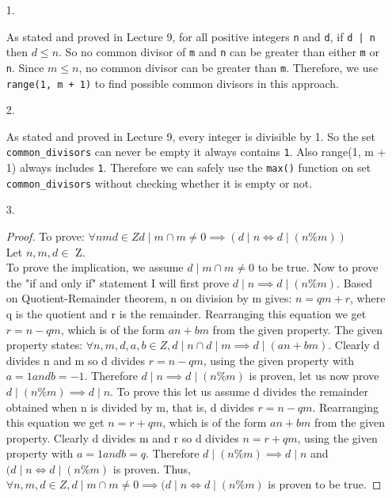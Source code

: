 \documentclass[11pt]{article}
\newcommand{\code}[1]{\texttt{#1}}
\begin{document}
\begin{enumerate}
\item[1.]

As stated and proved in Lecture 9, for all positive integers \code{n} and \code{d}, if \code{d | n} then $d \leq n$. So no common divisor of \code{m} and \code{n} can be greater than either \code{m} or \code{n}. Since $m \leq n$, no common divisor can be greater than \code{m}. Therefore, we use \code{range(1, m + 1)} to find possible common divisors in this approach.

\item[2.]

As stated and proved in Lecture 9, every integer is divisible by 1. So the set \code{common\_divisors} can never be empty it always contains \code{1}. Also range(1, m + 1) always includes \code{1}. Therefore we can safely use the \code{max()} function on set \code{common\_divisors} without checking whether it is empty or not.

\item[3.]

\begin{proof}

To prove: $\forall n m d \in Z d \mid m \cap m \ne 0 \implies ( d \mid n \iff d \mid (n \% m ))$ \\

Let $n, m, d \in$ Z. \\

To prove the implication, we assume $d \mid m \cap m \ne 0$ to be true. Now to prove the "if and only if" statement I will first prove $d \mid n \implies d \mid (n \% m)$. Based on Quotient-Remainder theorem, n on division by m gives: $n = qm + r$, where q is the quotient and r is the remainder. Rearranging this equation we get $r = n - qm$, which is of the form $an + bm$ from the given property. The given property states: $\forall n, m, d, a, b \in Z, d \mid n \cap d \mid m \implies d \mid (an + bm)$. Clearly d divides n and m so d divides $r = n - qm$, using the given property with $a = 1 and b = -1$. Therefore $d \mid n \implies d \mid (n \% m)$ is proven, let us now prove  $d \mid (n \% m) \implies d \mid n$. To prove this let us assume d divides the remainder obtained when n is divided by m, that is, d divides  $r = n - qm$. Rearranging this equation we get $n = r + qm$, which is of the form $an + bm$ from the given property. Clearly d divides m and r so d divides $n = r + qm$, using the given property with $a = 1 and b = q$. Therefore $d \mid (n \% m) \implies d \mid n$ and $(d \mid n \iff d \mid (n \% m )$ is proven. Thus, $\forall n, m, d \in Z, d \mid m \cap m \ne 0 \implies (d \mid n \iff d \mid (n \% m )$ is proven to be true.



\end{proof}
\end{enumerate}
\end{document}
